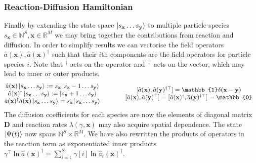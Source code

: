 \documentclass{article}[12pt]
\numberwithin{equation}{section}
\begin{document}
\subsubsection{Reaction-Diffusion Hamiltonian}\vspace{-10pt}
Finally by extending the state space $\ket{s_\mathbf{x}\dots s_\mathbf{y}}$ to multiple particle
species $s_\mathbf{x}\in\mathbb{N}^S,\mathbf{x}\in\mathbb{R}^M$ we may bring together the contributions
from reaction and diffusion. In order to simplify results we can vectorise the field operators
$\hat{a}(\mathbf{x}),\hat{a}(\mathbf{x})^{\dagger}$ such that their $i$th components are the field
operators for particle species $i$. Note that $^{\dagger}$ acts on the operator and $^\top$ acts on the
vector, which may lead to inner or outer products.
\begin{align}
	\begin{matrix}
		\hat{a}(\mathbf{x})\ket{s_\mathbf{x}\dots s_\mathbf{y}}
		:=s_\mathbf{x}\ket{s_\mathbf{x}-1\dots s_\mathbf{y}} \\
		\hat{a}(\mathbf{x})^{\dagger}\ket{s_\mathbf{x}\dots s_\mathbf{y}}
		:=\ket{s_\mathbf{x}+1\dots s_\mathbf{y}} \\
		\hat{a}(\mathbf{x})^{\dagger}
		\hat{a}(\mathbf{x})
		\ket{s_\mathbf{x}\dots s_\mathbf{y}}=s_\mathbf{x}\ket{s_\mathbf{x}\dots s_\mathbf{y}}
	\end{matrix}
	\qquad\qquad
	\begin{matrix}
		[		\hat{a}(\mathbf{x}),
				\hat{a}(\mathbf{y})^{\dagger\top} ]=\mathbb{1}\delta(\mathbf{x}-\mathbf{y}) \\
				[		\hat{a}(\mathbf{x}),
						\hat{a}(\mathbf{y})^{\top} ]=		[		\hat{a}(\mathbf{x})^{\dagger},
										\hat{a}(\mathbf{y})^{\dagger\top} ]=\mathbb{0}
	\end{matrix}
	\label{eq:vectorfieldoperators}
\end{align}
The diffusion coefficients for each species are now the elements
of diagonal matrix $\mathbf{D}$ and reaction rates $\lambda(\gamma,\mathbf{x})$ may also acquire
spatial dependence. The state $\ket{\Psi(t)}$ now spans $\mathbb{N}^S\times\mathbb{R}^M$. We have
also rewritten the products of operators in the reaction term as exponentiated inner products
$\gamma^{\top}\!\ln \hat{a}(\mathbf{x})^{\dagger}=\sum_{i=1}^{S}\gamma[i]\ln\hat{a}_i(\mathbf{x})^{\dagger}$.
\end{document}
